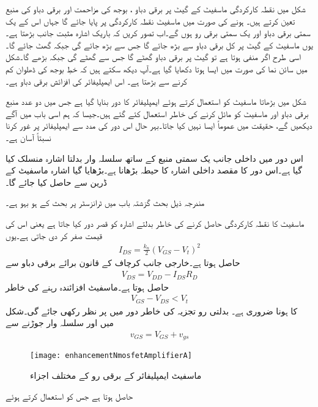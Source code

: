 شکل  میں نقطہ کارکردگی ماسفیٹ کے گیٹ پر برقی دباو ، بوجھ کی مزاحمت  اور برقی دباو کی منبع  تعین کرتے ہیں۔ ہونے کی صورت میں ماسفیٹ نقطہ کارکردگی پر پایا جائے گا جہاں اس کے یک سمتی برقی دباو  اور یک سمتی برقی رو  ہوں گے۔اب تصور کریں کہ باریک اشارہ  مثبت جانب بڑھتا ہے۔یوں ماسفیٹ کے گیٹ پر کل برقی دباو  سے بڑھ جائے گا جس سے   بڑھ جائے گی جبکہ  گھٹ جائے گا۔اسی طرح اگر  منفی ہوتا ہے تو گیٹ پر برقی دباو گھٹے گا جس سے  گھٹے گی جبکہ  بڑھے گا۔شکل میں سائن نما  کی صورت میں ایسا ہوتا دکھایا گیا ہے۔آپ دیکھ سکتے ہیں کہ خطِ بوجھ کی ڈھلوان کم کرنے سے  بڑھتا ہے۔ اس ایمپلیفائر کی افزائش برقی دباو  ہے۔

شکل   میں بڑھاتا ماسفیٹ کو استعمال کرتے ہوئے ایمپلیفائر کا دور بنایا گیا ہے جس میں دو عدد منبع برقی دباو   اور  ماسفیٹ کو مائل کرنے کی خاطر استعمال کئے گئے ہیں۔جیسا کہ ہم اسی باب میں آگے دیکھیں گے، حقیقت میں عموماً ایسا نہیں کیا جاتا۔بہر حال اس دور کی مدد سے ایمپلیفائر پر غور کرنا نسبتاً آسان ہے۔

اس دور میں داخلی جانب یک سمتی منبع  کے ساتھ سلسلہ وار بدلتا اشارہ  منسلک کیا گیا ہے۔اس دور کا مقصد داخلی اشارہ  کا حیطہ بڑھانا ہے۔بڑھایا گیا اشارہ ماسفیٹ کے ڈرین سے حاصل کیا جائے گا۔

مندرجہ ذیل بحث گزشتہ باب میں ٹرانزسٹر پر بحث کے ہو بہو ہے۔

 ماسفیٹ کا نقطہ کارکردگی حاصل کرنے کی خاطر بدلتے اشارہ کو قصر دور کیا جاتا ہے یعنی اس کی قیمت صفر کر دی جاتی ہے۔یوں
\begin{align} \label{مساوات_میدانی_یکسمتی_رو}
I_{DS}=\frac{k_n}{2} \left(V_{GS}-V_t \right )^2
\end{align}
حاصل ہوتا ہے۔خارجی جانب کرچاف کے قانون برائے برقی دباو سے
\begin{align} \label{مساوات_میدانی_یکسمتی_خارجی_دباو}
V_{DS}=V_{DD}-I_{DS}R_D
\end{align}
حاصل ہوتا ہے۔ماسفیٹ افزائندہ رہنے کی خاطر
\begin{align*}
V_{GS}-V_{DS}<V_t
\end{align*}
کا ہونا ضروری ہے۔
بدلتی رو تجزیہ کی خاطر دور میں  پر نظر رکھی جائے گی۔شکل   میں   اور  سلسلہ وار جوڑنے سے
\begin{align}
v_{GS}=V_{GS}+v_{gs}
\end{align}
%
\begin{figure}
\centering
\texttt{[image: enhancementNmosfetAmplifierA]}
\caption{ماسفیٹ ایمپلیفائر کے برقی رو کے مختلف اجزاء}
\label{شکل_ماسفیٹ_ایمپلیفائر_الف}
\end{figure}
حاصل ہوتا ہے جس کو استعمال کرتے ہوئے

